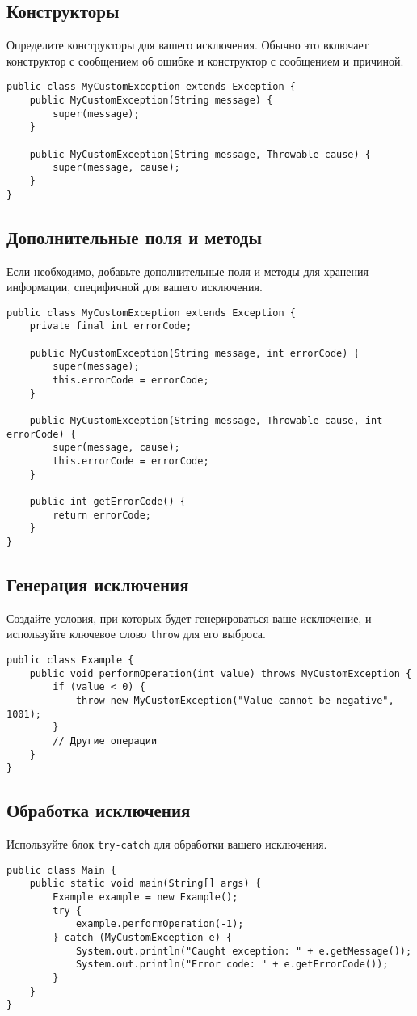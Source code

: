 \documentclass[12pt, a4paper]{article}
\begin{document}
\subsection*{Конструкторы}
Определите конструкторы для вашего исключения. Обычно это включает конструктор с сообщением об ошибке и конструктор с сообщением и причиной.

\begin{verbatim}
public class MyCustomException extends Exception {
    public MyCustomException(String message) {
        super(message);
    }

    public MyCustomException(String message, Throwable cause) {
        super(message, cause);
    }
}
\end{verbatim}

\subsection*{Дополнительные поля и методы}
Если необходимо, добавьте дополнительные поля и методы для хранения информации, специфичной для вашего исключения.

\begin{verbatim}
public class MyCustomException extends Exception {
    private final int errorCode;

    public MyCustomException(String message, int errorCode) {
        super(message);
        this.errorCode = errorCode;
    }

    public MyCustomException(String message, Throwable cause, int errorCode) {
        super(message, cause);
        this.errorCode = errorCode;
    }

    public int getErrorCode() {
        return errorCode;
    }
}
\end{verbatim}

\subsection*{Генерация исключения}
Создайте условия, при которых будет генерироваться ваше исключение, и используйте ключевое слово \texttt{throw} для его выброса.

\begin{verbatim}
public class Example {
    public void performOperation(int value) throws MyCustomException {
        if (value < 0) {
            throw new MyCustomException("Value cannot be negative", 1001);
        }
        // Другие операции
    }
}
\end{verbatim}

\subsection*{Обработка исключения}
Используйте блок \texttt{try-catch} для обработки вашего исключения.

\begin{verbatim}
public class Main {
    public static void main(String[] args) {
        Example example = new Example();
        try {
            example.performOperation(-1);
        } catch (MyCustomException e) {
            System.out.println("Caught exception: " + e.getMessage());
            System.out.println("Error code: " + e.getErrorCode());
        }
    }
}
\end{verbatim}
\end{document}

